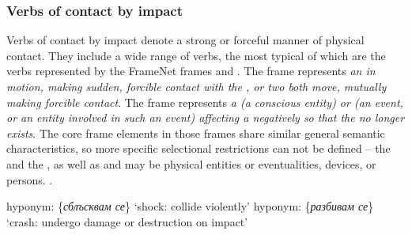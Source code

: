 \documentclass[output=paper,colorlinks,citecolor=brown]{langscibook}
\begin{document}
\subsubsection {Verbs of contact by impact} \label{4.3.2}
Verbs of contact by impact denote a strong or forceful manner of physical contact. They include a wide range of verbs, the most typical of which are the verbs represented by the FrameNet frames and . The frame  represents \textit{an  in motion, making sudden, forcible contact with the , or two  both move, mutually making forcible contact}. The frame  represents \textit{a  (a conscious entity) or  (an event, or an entity involved in such an event) affecting a  negatively so that the  no longer exists}. The core frame elements in those frames share similar general semantic characteristics, so more specific selectional restrictions can not be defined -- the  and the , as well as  and  may be physical entities or eventualities, devices, or persons.  .
\begin{exe}
\ex \label{bg:ch5:diff-vb4}
\begin{xlist}
\ex \label{bg:ch5:diff-vb4a}
hyponym: \{\textit{сблъсквам се}\} ‘shock: collide violently’
\ex \label{bg:ch5:diff-vb4b}
hyponym: \{\textit{разбивам се}\} ‘crash: undergo damage or destruction on impact’
\ex \label{bg:ch5:diff-vb4c}
\end{xlist}
\end{exe}
\end{document}
